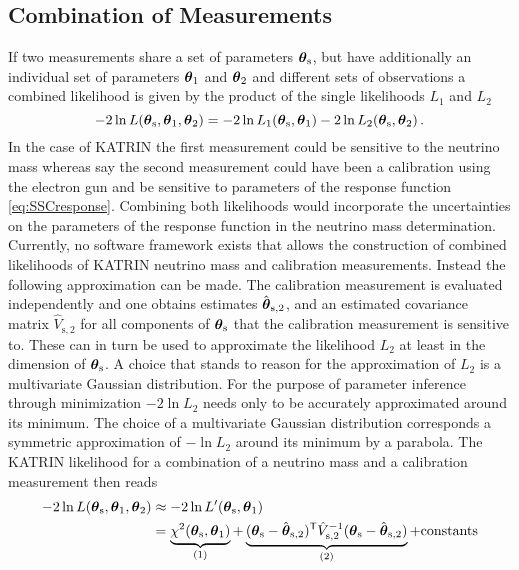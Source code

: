 \subsection{Combination of Measurements}
\label{sec:combinationOfMeasurements}
If two measurements share a set of parameters $\boldsymbol{\mathbf{\theta}}_\mathrm{s}$, but have additionally an individual set of parameters $\boldsymbol{\mathbf{\theta}}_1$ and $\boldsymbol{\mathbf{\theta}}_2$ and different sets of observations a combined likelihood is given by the product of the single likelihoods $L_1$ and $L_2$
\begin{equation}
	-2\ln L(\boldsymbol{\mathbf{\theta}}_\mathrm{s}, \boldsymbol{\mathbf{\theta}}_1, \boldsymbol{\mathbf{\theta}}_2) =  
		-2\ln L_1(\boldsymbol{\mathbf{\theta}}_\mathrm{s}, \boldsymbol{\mathbf{\theta}}_1)
		-2\ln L_2(\boldsymbol{\mathbf{\theta}}_\mathrm{s}, \boldsymbol{\mathbf{\theta}}_2)
	\text{\,.}
\end{equation}
In the case of KATRIN the first measurement could be sensitive to the neutrino mass whereas say the second measurement could have been a calibration using the electron gun and be sensitive to parameters of the response function \eqref{eq:SSCresponse}. Combining both likelihoods would incorporate the uncertainties on the parameters of the response function in the neutrino mass determination. Currently, no software framework exists that allows the construction of combined likelihoods of KATRIN neutrino mass and calibration measurements. Instead the following approximation can be made. The calibration measurement is evaluated independently and one obtains estimates $\hat{\boldsymbol{\mathbf{\theta}}}_\mathrm{s,2}$, and an estimated covariance matrix $\hat{V}_\mathrm{s,2}$ for all components of $\boldsymbol{\mathbf{\theta}}_\mathrm{s}$ that the calibration measurement is sensitive to. These can in turn be used to approximate the likelihood $L_2$ at least in the dimension of $\boldsymbol{\mathbf{\theta}}_\mathrm{s}$. A choice that stands to reason for the approximation of $L_2$ is a multivariate Gaussian distribution. For the purpose of parameter inference through minimization $-2\ln L_2$ needs only to be accurately approximated around its minimum. The choice of a multivariate Gaussian distribution corresponds a symmetric approximation of $-\ln L_2$ around its minimum by a parabola. The KATRIN likelihood for a combination of a neutrino mass and a calibration measurement then reads
\begin{equation}
	\begin{split}
	\label{eq:penalizedLikelihood}
	-2\ln L(\paramVecShared, \paramVec_1, \paramVec_2) &\approx
	-2\ln L^\prime(\paramVecShared, \paramVec_1) \\ &=
	\underbrace{
		\chi^2(\paramVecShared, \paramVec_1)
		\vphantom{(\paramVecShared - \hat{\paramVec}_\mathrm{s,2})^{\mathsf{T}}}
	}_{(1)}
	+
	\underbrace{
		(\paramVecShared - \hat{\paramVec}_\mathrm{s,2})^{\mathsf{T}}
		\hat{V}_\mathrm{s,2}^{-1}
		(\paramVecShared - \hat{\paramVec}_\mathrm{s,2})
	}_{(2)}
	+ \mathrm{ constants}
	\end{split}
\end{equation}
